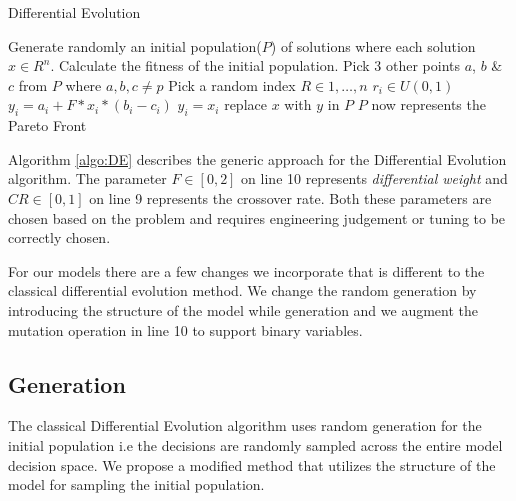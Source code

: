 \begin{algorithm}[!hbtp]
\caption{Differential Evolution}
\label{algo:DE}
\begin{algorithmic}[1]
\State Generate randomly an initial population($P$) of solutions where each solution $x \in R^n$.
\State Calculate the fitness of the initial population.
\Repeat
        \State Pick 3 other points $a$, $b$ \& $c$ from $P$ where $a,b,c \neq p$
        \State Pick a random index $R \in {1, \ldots, n}$
            \State $r_i \in U(0,1)$
                \State $y_i = a_i + F * x_i *  (b_i - c_i)$
            \Else
                \State $y_i = x_i$
            \EndIf
        \EndFor
            \State replace $x$ with $y$ in $P$
        \EndIf
    \EndFor
{}
\State $P$ now represents the Pareto Front
\end{algorithmic}
\end{algorithm}

Algorithm \ref{algo:DE} describes the generic approach for the Differential Evolution algorithm. The parameter $F \in [0,2]$ on line 10 represents \textit{differential weight} and $CR \in [0,1]$ on line 9 represents the crossover rate. Both these parameters are chosen based on the problem and requires engineering judgement or tuning to be correctly chosen.

For our models there are a few changes we incorporate that is different to the classical differential evolution method. We change the random generation by introducing the structure of the model while generation and we augment the mutation operation in line 10 to support binary variables.

\subsection{Generation}
\label{subsec:sa:de:gen}

The classical Differential Evolution algorithm uses random generation for the initial population i.e the decisions are randomly sampled across the entire model decision space. We propose a modified method that utilizes the structure of the model for sampling the initial population.

